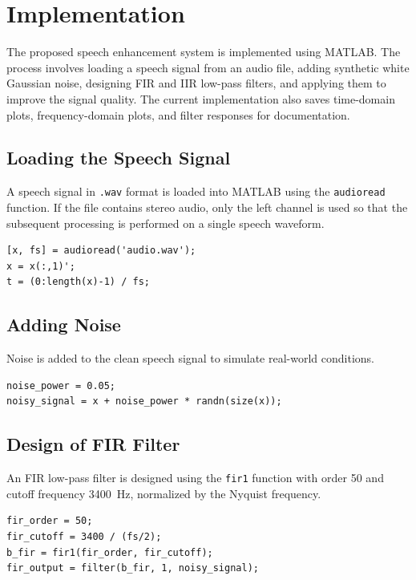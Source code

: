\documentclass[conference]{IEEEtran}
\begin{document}
\section{Implementation}

The proposed speech enhancement system is implemented using MATLAB. The process involves loading a speech signal from an audio file, adding synthetic white Gaussian noise, designing FIR and IIR low-pass filters, and applying them to improve the signal quality. The current implementation also saves time-domain plots, frequency-domain plots, and filter responses for documentation.

\subsection{Loading the Speech Signal}

A speech signal in \texttt{.wav} format is loaded into MATLAB using the \texttt{audioread} function. If the file contains stereo audio, only the left channel is used so that the subsequent processing is performed on a single speech waveform.

\begin{lstlisting}[basicstyle=\footnotesize\ttfamily, breaklines=true]
[x, fs] = audioread('audio.wav');
x = x(:,1)';
t = (0:length(x)-1) / fs;
\end{lstlisting}

\subsection{Adding Noise}

Noise is added to the clean speech signal to simulate real-world conditions.

\begin{lstlisting}[basicstyle=\footnotesize\ttfamily, breaklines=true]
noise_power = 0.05;
noisy_signal = x + noise_power * randn(size(x));
\end{lstlisting}

\subsection{Design of FIR Filter}

An FIR low-pass filter is designed using the \texttt{fir1} function with order 50 and cutoff frequency 3400~Hz, normalized by the Nyquist frequency.

\begin{lstlisting}[basicstyle=\footnotesize\ttfamily, breaklines=true]
fir_order = 50;
fir_cutoff = 3400 / (fs/2);
b_fir = fir1(fir_order, fir_cutoff);
fir_output = filter(b_fir, 1, noisy_signal);
\end{lstlisting}
\end{document}
